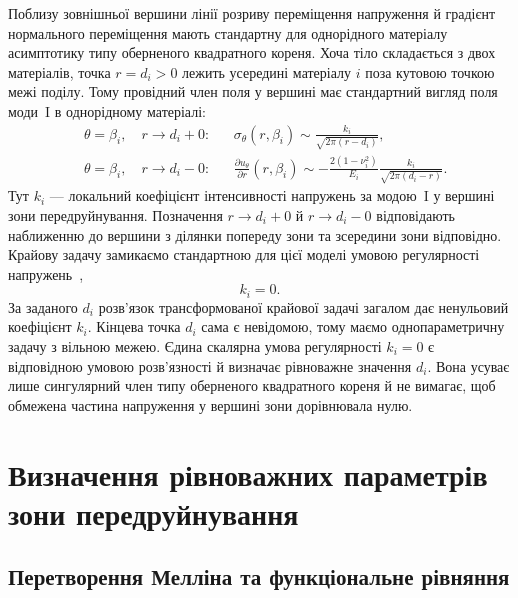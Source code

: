 Поблизу зовнішньої вершини лінії розриву переміщення напруження й градієнт нормального переміщення мають стандартну для однорідного матеріалу асимптотику типу оберненого квадратного кореня. Хоча тіло складається з двох матеріалів, точка $r=d_i>0$ лежить усередині матеріалу $i$ поза кутовою точкою межі поділу. Тому провідний член поля у вершині має стандартний вигляд поля моди~I в однорідному матеріалі:
\begin{equation}
\label{eq:zone-tip-asymptotics}
\begin{aligned}
  &\theta=\beta_i,\quad r\to d_i+0:
  &&\sigma_\theta(r,\beta_i)
    \sim \frac{k_i}{\sqrt{2\pi(r-d_i)}},\\[3pt]
  &\theta=\beta_i,\quad r\to d_i-0:
  &&\frac{\partial u_\theta}{\partial r}(r,\beta_i)
    \sim -\frac{2(1-\nu_i^2)}{E_i}
    \frac{k_i}{\sqrt{2\pi(d_i-r)}}.
\end{aligned}
\end{equation}
Тут $k_i$ — локальний коефіцієнт інтенсивності напружень за модою~I у вершині зони передруйнування. Позначення $r\to d_i+0$ й $r\to d_i-0$ відповідають наближенню до вершини з ділянки попереду зони та зсередини зони відповідно. Крайову задачу замикаємо стандартною для цієї моделі умовою регулярності напружень~\citep{KaminskyDudykPolishchuk2024},
\begin{equation*}
  k_i=0.
\end{equation*}
За заданого $d_i$ розв’язок трансформованої крайової задачі загалом дає ненульовий коефіцієнт $k_i$. Кінцева точка $d_i$ сама є невідомою, тому маємо однопараметричну задачу з вільною межею. Єдина скалярна умова регулярності $k_i=0$ є відповідною умовою розв’язності й визначає рівноважне значення $d_i$. Вона усуває лише сингулярний член типу оберненого квадратного кореня й не вимагає, щоб обмежена частина напруження у вершині зони дорівнювала нулю.

\section{Визначення рівноважних параметрів зони передруйнування}
\label{sec:derivation}

\subsection{Перетворення Мелліна та функціональне рівняння}
\label{subsec:mellin}

